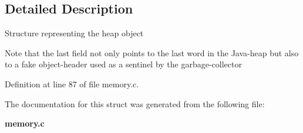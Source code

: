 \subsection{Detailed Description}
Structure representing the heap object

Note that the last field not only points to the last word in the Java-\/heap but also to a fake object-\/header used as a sentinel by the garbage-\/collector 

Definition at line 87 of file memory.c.



The documentation for this struct was generated from the following file:\begin{DoxyCompactItemize}
\item 
{\bf memory.c}\end{DoxyCompactItemize}
